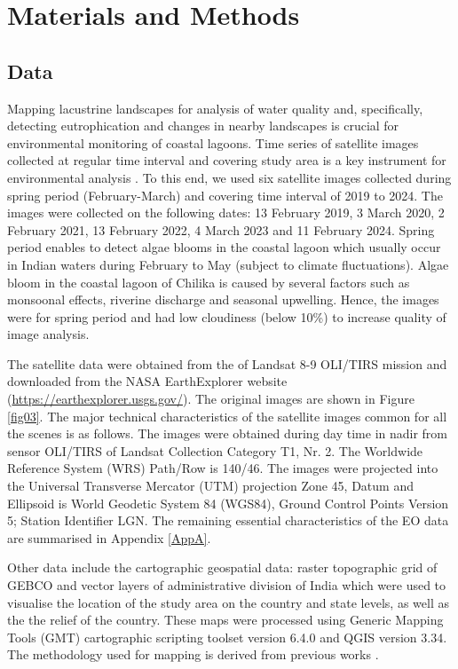 \documentclass[jmse,article,submit,pdftex,moreauthors]{Definitions/mdpi}
\begin{document}
\section{Materials and Methods}

\subsection{Data}

Mapping lacustrine landscapes for analysis of water quality and, specifically, detecting eutrophication and changes in nearby landscapes is crucial for environmental monitoring of coastal lagoons. Time series of satellite images collected at regular time interval and covering study area is a key instrument for environmental analysis \cite{Lemenkova202324}. To this end, we used six satellite images collected during spring period (February-March) and covering time interval of 2019 to 2024. The images were collected on the following dates: 13 February 2019, 3 March 2020, 2 February 2021, 13 February 2022, 4 March 2023 and 11 February 2024. Spring period enables to detect algae blooms in the coastal lagoon which usually occur in Indian waters during February to May (subject to climate fluctuations). Algae bloom in the coastal lagoon of Chilika is caused by several factors such as monsoonal effects, riverine discharge and seasonal upwelling. Hence, the images were for spring period and had low cloudiness (below 10\%) to increase quality of image analysis.

The satellite data were obtained from the of Landsat 8-9 OLI/TIRS mission and downloaded from the NASA EarthExplorer website (\href{https://earthexplorer.usgs.gov/}{https://earthexplorer.usgs.gov/}). The original images are shown in Figure \ref{fig03}. The major technical characteristics of the satellite images common for all the scenes is as follows. The images were obtained during day time in nadir from sensor OLI/TIRS of Landsat Collection Category T1, Nr. 2. The Worldwide Reference System (WRS) Path/Row is 140/46. The images were projected into the Universal Transverse Mercator (UTM) projection Zone 45, Datum and Ellipsoid is World Geodetic System 84 (WGS84), Ground Control Points Version 5; Station Identifier LGN. The remaining essential characteristics of the EO data are summarised in Appendix \ref{AppA}.

Other data include the cartographic geospatial data: raster topographic grid of GEBCO and vector layers of administrative division of India which were used to visualise the location of the study area on the country and state levels, as well as the the relief of the country. These maps were processed using Generic Mapping Tools (GMT) cartographic scripting toolset version 6.4.0 \cite{Wessel} and QGIS version 3.34. The methodology used for mapping is derived from previous works \cite{Lemenkova202217,Lemenkova202212,Lemenkova202203}.
\end{document}
